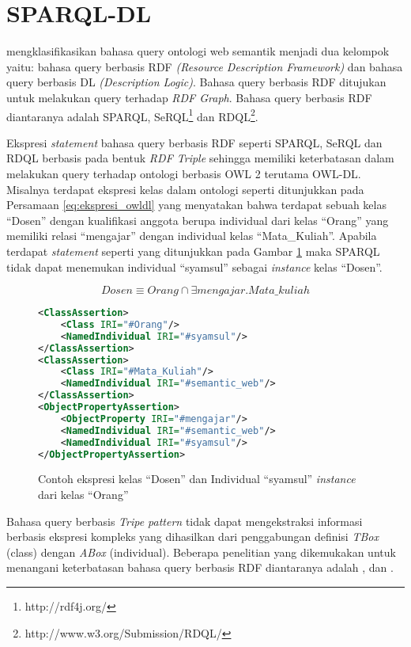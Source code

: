 \section{SPARQL-DL}
\citet{evren_sirin} mengklasifikasikan bahasa query ontologi web semantik menjadi dua kelompok yaitu: bahasa query berbasis RDF \emph{(Resource Description Framework)} dan bahasa query berbasis DL \emph{(Description Logic)}. Bahasa query berbasis RDF ditujukan untuk melakukan query terhadap \emph{RDF Graph}. Bahasa query berbasis RDF diantaranya adalah SPARQL, SeRQL\footnote{http://rdf4j.org/} dan RDQL\footnote{http://www.w3.org/Submission/RDQL/}.

Ekspresi \emph{statement} bahasa query berbasis RDF seperti SPARQL, SeRQL dan RDQL berbasis pada bentuk \emph{RDF Triple} sehingga memiliki keterbatasan dalam melakukan query terhadap ontologi berbasis OWL 2 terutama OWL-DL. Misalnya terdapat ekspresi kelas dalam ontologi seperti ditunjukkan pada Persamaan \ref{eq:ekspresi_owldl} yang menyatakan bahwa terdapat sebuah kelas ``Dosen'' dengan kualifikasi anggota berupa individual dari kelas ``Orang'' yang memiliki relasi ``mengajar'' dengan individual kelas ``Mata\_Kuliah''. Apabila terdapat \emph{statement} seperti yang ditunjukkan pada Gambar \ref{fig:owl_entailment} maka SPARQL tidak dapat menemukan individual ``syamsul'' sebagai \emph{instance} kelas ``Dosen''.

\vspace{0.08cm}
\begin{equation}
	\label{eq:ekspresi_owldl}
	Dosen \equiv Orang \cap \exists mengajar.Mata\_kuliah 
\end{equation}
\vspace{0.08cm}

\begin{figure}[ht]
	\begin{lstlisting}[language=XML]
<ClassAssertion>
	<Class IRI="#Orang"/>
	<NamedIndividual IRI="#syamsul"/>
</ClassAssertion>
<ClassAssertion>
	<Class IRI="#Mata_Kuliah"/>
	<NamedIndividual IRI="#semantic_web"/>
</ClassAssertion>
<ObjectPropertyAssertion>
	<ObjectProperty IRI="#mengajar"/>
	<NamedIndividual IRI="#semantic_web"/>
	<NamedIndividual IRI="#syamsul"/>
</ObjectPropertyAssertion>\end{lstlisting}
\caption{Contoh ekspresi kelas ``Dosen'' dan Individual ``syamsul'' \emph{instance} dari kelas ``Orang''}
\label{fig:owl_entailment}
\end{figure}

Bahasa query berbasis \emph{Tripe pattern} tidak dapat mengekstraksi informasi berbasis ekspresi kompleks yang dihasilkan dari penggabungan definisi \emph{TBox} (class) dengan \emph{ABox} (individual). Beberapa penelitian yang dikemukakan untuk menangani keterbatasan bahasa query berbasis RDF diantaranya adalah \citet{evren_sirin}, \citet{kubias} dan \cite{fikes}. 

